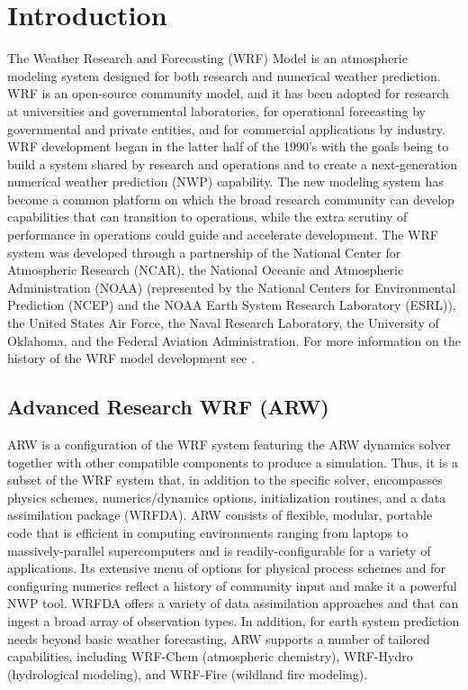 \chapter{Introduction}
\label{introduction_chap}
The Weather Research and Forecasting (WRF) Model is
an atmospheric modeling system designed for both research and numerical 
weather prediction.  WRF is an open-source community model, and it has been 
adopted for research at universities and governmental laboratories, 
for operational forecasting by governmental and private entities,
and for commercial applications by industry.  WRF development began in the latter 
half of the 1990's with the goals being to build a system shared by research 
and operations and to create a next-generation numerical weather 
prediction (NWP) capability.  The new modeling system has become a 
common platform on which the broad research community 
can develop capabilities that can transition to operations, 
while the extra scrutiny of performance in operations
could guide and accelerate development.  The WRF system was developed
through a partnership of the National 
Center for Atmospheric Research (NCAR), the National Oceanic and Atmospheric 
Administration (NOAA) (represented by the National Centers for Environmental 
Prediction (NCEP) and the NOAA Earth System Research Laboratory (ESRL)), 
the United States Air Force, the Naval Research Laboratory, the 
University of Oklahoma, and the Federal Aviation Administration.  
For more information 
on the history of the WRF model development see \citet{powers17}.

\section {Advanced Research WRF (ARW)}

ARW is a configuration of the WRF system featuring
the ARW dynamics solver together with other compatible components 
to produce a simulation.  Thus, 
it is a subset of the WRF system that, in addition to the specific solver, 
encompasses physics schemes, numerics/dynamics options, 
initialization routines, and a data assimilation package (WRFDA).  
ARW consists of flexible, modular, portable code that is 
efficient in computing environments ranging from laptops to 
massively-parallel supercomputers and is readily-configurable for 
a variety of applications.  Its extensive menu of options 
for physical process schemes and for configuring numerics  
reflect a history of community input
and make it a powerful NWP tool.  WRFDA offers a variety of data assimilation approaches and that can ingest a 
broad array of observation types.  In addition, for earth system prediction needs 
beyond basic weather forecasting, ARW supports a number of tailored capabilities, including 
WRF-Chem (atmospheric chemistry), 
WRF-Hydro (hydrological modeling), and WRF-Fire (wildland fire modeling).

